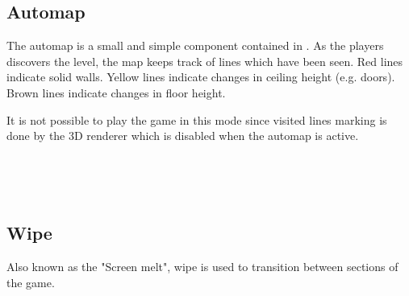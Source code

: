 \subsection{Automap}
The automap is a small and simple component contained in . As the players discovers the level, the map keeps track of lines which have been seen. Red lines indicate solid walls. Yellow lines indicate changes in ceiling height (e.g. doors). Brown lines indicate changes in floor height.\\
\par
It is not possible to play the game in this mode since visited lines marking is done by the 3D renderer which is disabled when the automap is active.\\
\par
{}
\par
{}\\
\par
{}\\
\par






\subsection{Wipe}
\label{label_melt}
Also known as the "Screen melt", wipe is used to transition between sections of the game.

\par
{}\\
\pagebreak

\\
\pagebreak

